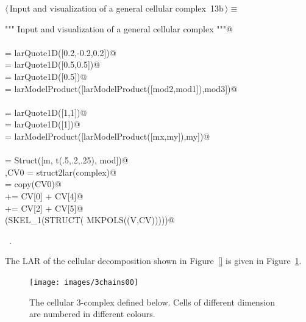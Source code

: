 \documentclass[11pt,oneside]{article}	%
\begin{document}
\begin{flushleft} \small \label{scrap23}
\protect{}$\langle\,$Input and visualization of a general cellular complex\nobreak\ {\footnotesize 13b}$\,\rangle\equiv$
\vspace{-1ex}
\begin{list}{}{} \item
\mbox{}\verb@""" Input and visualization of a general cellular complex """@\\
\mbox{}\verb@@\\
\mbox{} = larQuote1D([0.2,-0.2,0.2])@\\
\mbox{} = larQuote1D([0.5,0.5])@\\
\mbox{} = larQuote1D([0.5])@\\
\mbox{}\verb@mod = larModelProduct([larModelProduct([mod2,mod1]),mod3])@\\
\mbox{}\verb@@\\
\mbox{}\verb@mx = larQuote1D([1,1])@\\
\mbox{}\verb@my = larQuote1D([1])@\\
\mbox{}\verb@m = larModelProduct([larModelProduct([mx,my]),my])@\\
\mbox{}\verb@@\\
\mbox{}\verb@complex = Struct([m, t(.5,.2,.25), mod])@\\
\mbox{}\verb@V,CV0 = struct2lar(complex)@\\
\mbox{}\verb@CV = copy(CV0)@\\
\mbox{}\verb@CV[1] += CV[0] + CV[4]@\\
\mbox{}\verb@CV[3] += CV[2] + CV[5]@\\
\mbox{}\verb@VIEW(SKEL_1(STRUCT( MKPOLS((V,CV)))))@\\
\mbox{}\verb@@{\NWsep}
\end{list}
\vspace{-1ex}
\footnotesize\addtolength{\baselineskip}{-1ex}
\begin{list}{}{\setlength{\itemsep}{-\parsep}\setlength{\itemindent}{-\leftmargin}}
\item \NWtxtMacroRefIn\ .
\end{list}
\end{flushleft}

The LAR of the cellular decomposition shown in Figure~\ref{} is given in Figure~\ref{fig:3chains00}.
\begin{figure}[htbp] %
   \centering
   \texttt{[image: images/3chains00]} 
   \caption{The cellular 3-complex defined below. Cells of different dimension are numbered in different colours.}
   \label{fig:3chains00}
\end{figure}
\end{document}
